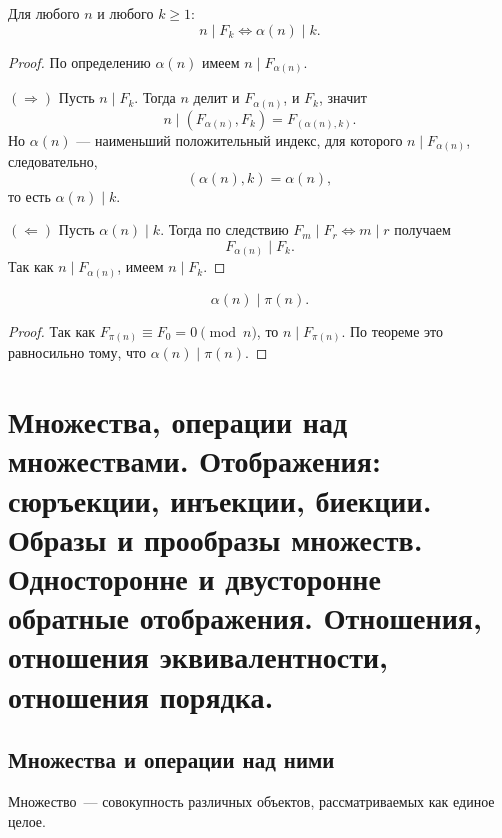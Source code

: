 \documentclass[12pt]{article}
\begin{document}
    \begin{theorem}
    	Для любого $n$ и любого $k \geqslant 1$:
    	\[
    	n \mid F_k \iff \alpha(n) \mid k.
    	\]
    \end{theorem}
    
    \begin{proof}
    	По определению $\alpha(n)$ имеем $n \mid F_{\alpha(n)}$.
    
    	$(\Rightarrow)$ Пусть $n \mid F_k$. Тогда $n$ делит и $F_{\alpha(n)}$, и $F_k$, значит
    	\[
    	n \mid (F_{\alpha(n)},F_k)=F_{(\alpha(n),k)}.
    	\]
    	Но $\alpha(n)$ --- наименьший положительный индекс, для которого $n \mid F_{\alpha(n)}$, следовательно,
    	\[
    	(\alpha(n),k)=\alpha(n),
    	\]
    	то есть $\alpha(n) \mid k$.
    
    	$(\Leftarrow)$ Пусть $\alpha(n) \mid k$. Тогда по следствию $F_m \mid F_r \iff m \mid r$ получаем
    	\[
    	F_{\alpha(n)} \mid F_k.
    	\]
    	Так как $n \mid F_{\alpha(n)}$, имеем $n\mid F_k$.
    \end{proof}
    
    \begin{corollary}
    	\[
    	\alpha(n) \mid \pi(n).
    	\]
    \end{corollary}
    
    \begin{proof}
    	Так как $F_{\pi(n)} \equiv F_0=0 \pmod n$, то $n \mid F_{\pi(n)}$. По теореме это равносильно тому, что $\alpha(n) \mid \pi(n)$.
    \end{proof}
	
	\newpage
	
	\section{Множества, операции над множествами. Отображения: сюръекции, инъекции, биекции. Образы и прообразы множеств. Односторонне и двусторонне обратные отображения. Отношения, отношения эквивалентности, отношения порядка.}
	
	\subsection{Множества и операции над ними}
	
	\begin{definition}
		Множество~--- совокупность различных объектов, рассматриваемых как единое целое.
	\end{definition}
	
\end{document}
